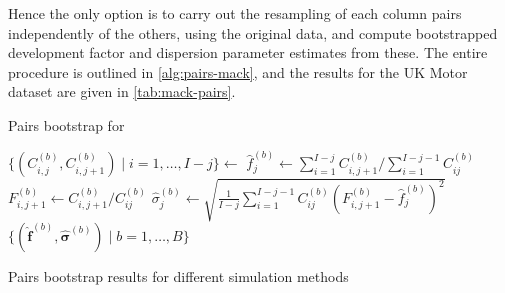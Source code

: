 \documentclass[a4paper]{book}
\begin{document}
Hence the only option is to carry out the resampling of each column pairs independently of the others, using the original data, and compute bootstrapped development factor and dispersion parameter estimates from these. The entire procedure is outlined in \cref{alg:pairs-mack}, and the results for the UK Motor dataset are given in \cref{tab:mack-pairs}.

\begin{algorithm}[!htb]
  \caption{Pairs bootstrap for }
  \label{alg:pairs-mack}
  \begin{algorithmic}
        \vspace{5pt}
        \State $\{ (C^{(b)}_{i, j}, C^{(b)}_{i, j + 1}) \mid i = 1, \dots, I - j \} \gets$ 
        \vspace{5pt}
        \State $\widehat{f}^{(b)}_j \gets \sum_{i = 1}^{I - j} C^{(b)}_{i, j + 1} / \sum_{i = 1}^{I - j - 1} C^{(b)}_{ij}$
        \vspace{5pt}
          \State $\displaystyle F^{(b)}_{i, j + 1} \gets C^{(b)}_{i, j + 1} / C^{(b)}_{ij}$
          \vspace{5pt}
        \EndFor
        \State $\displaystyle \widehat{\sigma}^{(b)}_j \gets \sqrt{\frac{1}{I-j}\sum_{i = 1}^{I - j - 1} C^{(b)}_{ij}\left( F^{(b)}_{i, j + 1} - \widehat{f}^{(b)}_j \right)^2}$
      \EndFor
    \EndFor
    \State \Return $\{ (\widehat{\bm{f}}^{(b)}, \widehat{\bm{\sigma}}^{(b)}) \mid b = 1, \dots, B \}$
  \end{algorithmic}
\end{algorithm}

\begin{table}[!htb]
  \begin{subtable}{0.5\linewidth}
    
  \end{subtable}
  \hfill
  \begin{subtable}{0.5\linewidth}
    
  \end{subtable}
  \caption{Pairs bootstrap results for different simulation methods}
  \label{tab:mack-pairs}
\end{table}
\end{document}
